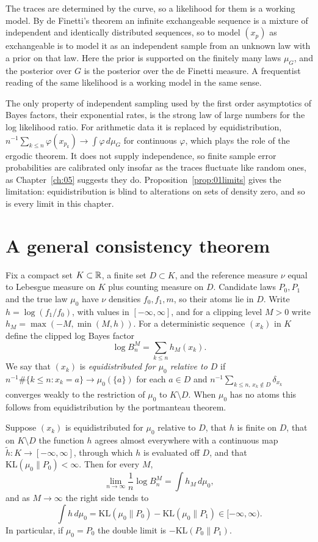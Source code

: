 The traces are determined by the curve, so a likelihood for them is a working model. By de Finetti's theorem \cite{definetti1937,hewittsavage1955} an infinite exchangeable sequence is a mixture of independent and identically distributed sequences, so to model $(x_p)$ as exchangeable is to model it as an independent sample from an unknown law with a prior on that law. Here the prior is supported on the finitely many laws $\mu_G$, and the posterior over $G$ is the posterior over the de Finetti measure. A frequentist reading of the same likelihood is a working model in the same sense.

The only property of independent sampling used by the first order asymptotics of Bayes factors, their exponential rates, is the strong law of large numbers for the log likelihood ratio. For arithmetic data it is replaced by equidistribution, $n^{-1}\sum_{k\le n}\varphi(x_{p_k})\to\int\varphi\,d\mu_G$ for continuous $\varphi$, which plays the role of the ergodic theorem. It does not supply independence, so finite sample error probabilities are calibrated only insofar as the traces fluctuate like random ones, as Chapter~\ref{ch:05} suggests they do. Proposition~\ref{prop:01limits} gives the limitation: equidistribution is blind to alterations on sets of density zero, and so is every limit in this chapter.

\section{A general consistency theorem}

Fix a compact set $K\subset\mathbb{R}$, a finite set $D\subset K$, and the reference measure $\nu$ equal to Lebesgue measure on $K$ plus counting measure on $D$. Candidate laws $P_0,P_1$ and the true law $\mu_0$ have $\nu$ densities $f_0,f_1,m$, so their atoms lie in $D$. Write $h=\log(f_1/f_0)$, with values in $[-\infty,\infty]$, and for a clipping level $M>0$ write $h_M=\max(-M,\min(M,h))$. For a deterministic sequence $(x_k)$ in $K$ define the clipped log Bayes factor
\[
\log B_n^M=\sum_{k\le n}h_M(x_k).
\]
We say that $(x_k)$ is \emph{equidistributed for $\mu_0$ relative to $D$} if $n^{-1}\#\{k\le n:x_k=a\}\to\mu_0(\{a\})$ for each $a\in D$ and $n^{-1}\sum_{k\le n,\,x_k\notin D}\delta_{x_k}$ converges weakly to the restriction of $\mu_0$ to $K\setminus D$. When $\mu_0$ has no atoms this follows from equidistribution by the portmanteau theorem.

\begin{theorem}\label{thm:12consist}
Suppose $(x_k)$ is equidistributed for $\mu_0$ relative to $D$, that $h$ is finite on $D$, that on $K\setminus D$ the function $h$ agrees almost everywhere with a continuous map $\tilde h:K\to[-\infty,\infty]$, through which $h$ is evaluated off $D$, and that $\mathrm{KL}(\mu_0\|P_0)<\infty$. Then for every $M$,
\[
\lim_{n\to\infty}\frac1n\log B_n^M=\int h_M\,d\mu_0,
\]
and as $M\to\infty$ the right side tends to
\[
\int h\,d\mu_0=\mathrm{KL}(\mu_0\|P_0)-\mathrm{KL}(\mu_0\|P_1)\in[-\infty,\infty).
\]
In particular, if $\mu_0=P_0$ the double limit is $-\mathrm{KL}(P_0\|P_1)$.
\end{theorem}

